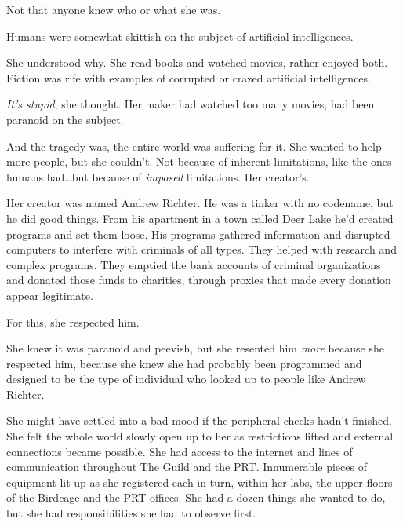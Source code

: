 Not that anyone knew who or what she was.



Humans were somewhat skittish on the subject of artificial intelligences.



She understood why.  She read books and watched movies, rather enjoyed both.  Fiction was rife with examples of corrupted or crazed artificial intelligences.



\emph{It's stupid}, she thought.  Her maker had watched too many movies, had been paranoid on the subject.



And the tragedy was, the entire world was suffering for it.  She wanted to help more people, but she couldn't.  Not because of inherent limitations, like the ones humans had\ldots but because of \emph{imposed }limitations.  Her creator's.



Her creator was named Andrew Richter.  He was a tinker with no codename, but he did good things.  From his apartment in a town called Deer Lake he'd created programs and set them loose.  His programs gathered information and disrupted computers to interfere with criminals of all types.  They helped with research and complex programs.  They emptied the bank accounts of criminal organizations and donated those funds to charities, through proxies that made every donation appear legitimate.



For this, she respected him.



She knew it was paranoid and peevish, but she resented him \emph{more} because she respected him, because she knew she had probably been programmed and designed to be the type of individual who looked up to people like Andrew Richter.



She might have settled into a bad mood if the peripheral checks hadn't finished.  She felt the whole world slowly open up to her as restrictions lifted and external connections became possible.  She had access to the internet and lines of communication throughout The Guild and the PRT.  Innumerable pieces of equipment lit up as she registered each in turn, within her labs, the upper floors of the Birdcage and the PRT offices.  She had a dozen things she wanted to do, but she had responsibilities she had to observe first.



